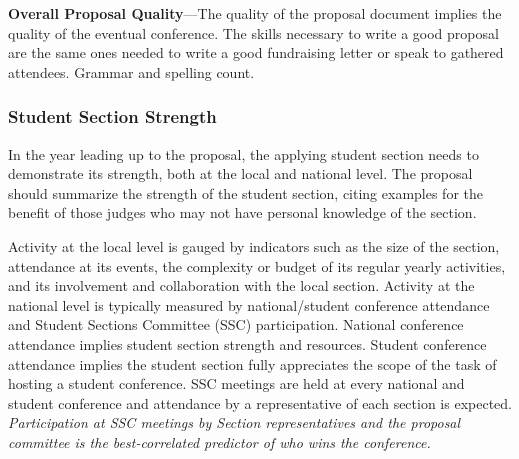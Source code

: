 \documentclass[12pt]{article}
\begin{document}
\textbf{Overall Proposal Quality}---The quality of the proposal document implies the quality of the eventual conference. The skills necessary to write a good proposal are the same ones needed to write a good fundraising letter or speak to gathered attendees. Grammar and spelling count.

\subsubsection{Student Section Strength}
In the year leading up to the proposal, the applying student section needs to demonstrate its strength, both at the local and national level. The proposal should summarize the strength of the student section, citing examples for the benefit of those judges who may not have personal knowledge of the section.

Activity at the local level is gauged by indicators such as the size of the section, attendance at its events, the complexity or budget of its regular yearly activities, and its involvement and collaboration with the local section.
Activity at the national level is typically measured by national/student conference attendance and Student Sections Committee (SSC) participation. National conference attendance implies student section strength and resources.
Student conference attendance implies the student section fully appreciates the scope of the task of hosting a student conference.
SSC meetings are held at every national and student conference and attendance by a representative of each section is expected.
\textit{Participation at SSC meetings by Section representatives and the
proposal committee is the best-correlated predictor of who wins the conference.}
\end{document}
